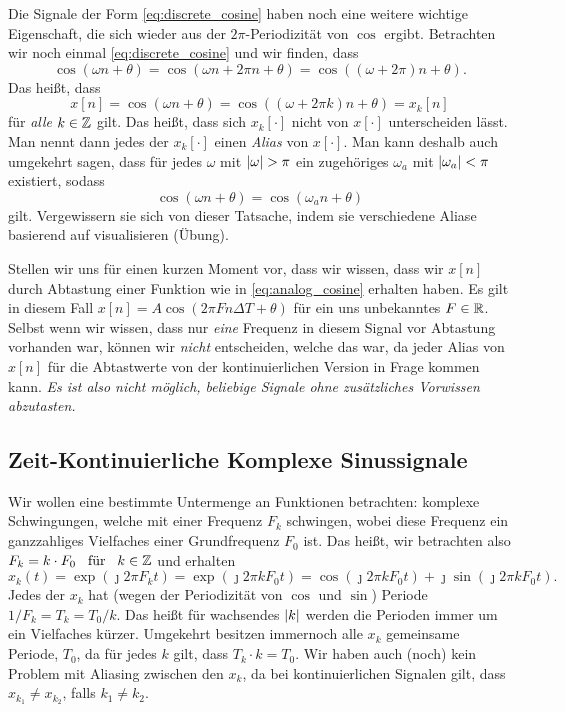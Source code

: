 Die Signale der Form \eqref{eq:discrete_cosine} haben noch eine weitere wichtige Eigenschaft, die sich wieder aus der $2\pi$-Periodizität von $\cos$ ergibt. 
Betrachten wir noch einmal \eqref{eq:discrete_cosine} und wir finden, dass
\[
\cos(\omega n + \theta) = \cos(\omega n + 2\pi n + \theta) = \cos((\omega + 2\pi) n + \theta).
\]
Das heißt, dass
\[
    x[n] = \cos(\omega n + \theta) = \cos((\omega + 2\pi k) n + \theta) = x_k[n]
\]
für \emph{alle} $k \in \mathbb{Z}$ gilt.
Das heißt, dass sich $x_k[\cdot]$ nicht von $x[\cdot]$ unterscheiden lässt.
Man nennt dann jedes der $x_k[\cdot]$ einen \emph{Alias} von $x[\cdot]$.
Man kann deshalb auch umgekehrt sagen, dass für jedes $\omega$ mit ${\left| \omega \right|} > \pi$ ein zugehöriges $\omega_a$ mit ${\left| \omega_a \right|} < \pi$ existiert, sodass
\[
    \cos(\omega n + \theta) = \cos(\omega_a n + \theta)
\]
gilt.
Vergewissern sie sich von dieser Tatsache, indem sie verschiedene Aliase basierend auf  visualisieren (Übung).

Stellen wir uns für einen kurzen Moment vor, dass wir wissen, dass wir $x[n]$ durch Abtastung einer Funktion wie in \eqref{eq:analog_cosine} erhalten haben.
Es gilt in diesem Fall $x[n] = A \cos( 2 \pi F n \Delta T + \theta )$ für ein uns unbekanntes $F \in \mathbb{R}$.
Selbst wenn wir wissen, dass nur \emph{eine} Frequenz in diesem Signal vor Abtastung vorhanden war, können wir \emph{nicht} entscheiden, welche das war, da jeder Alias von $x[n]$ für die Abtastwerte von der kontinuierlichen Version in Frage kommen kann.
\emph{Es ist also nicht möglich, beliebige Signale ohne zusätzliches Vorwissen  abzutasten.}
%
\FloatBarrier
%
\subsection{Zeit-Kontinuierliche Komplexe Sinussignale}\label{sec:cont_complex_harm}
%
Wir wollen eine bestimmte Untermenge an Funktionen betrachten: komplexe Schwingungen, welche mit einer Frequenz $F_k$ schwingen, wobei diese Frequenz ein ganzzahliges Vielfaches einer Grundfrequenz $F_0$ ist.
Das heißt, wir betrachten also $F_k = k \cdot F_0 {\hspace{3mm} \text{für} \hspace{3mm}} k \in \mathbb{Z} $ und erhalten
\[
x_k(t) = \exp(\jmath 2 \pi F_k t) = \exp(\jmath 2 \pi k F_0 t) = \cos(\jmath 2 \pi k F_0 t) + \jmath \sin(\jmath 2 \pi k F_0 t).
\]
Jedes der $x_k$ hat (wegen der Periodizität von $\cos$ und $\sin$) Periode $1/F_k = T_k = T_0/k$. 
Das heißt für wachsendes ${\left| k \right|}$ werden die Perioden immer um ein Vielfaches kürzer. 
Umgekehrt besitzen immernoch alle $x_k$ gemeinsame Periode, $T_0$, da für jedes $k$ gilt, dass $T_k \cdot k = T_0$.
Wir haben auch (noch) kein Problem mit Aliasing zwischen den $x_k$, da bei kontinuierlichen Signalen gilt, dass $x_{k_1} \neq x_{k_2}$, falls $k_1 \neq k_2$.

